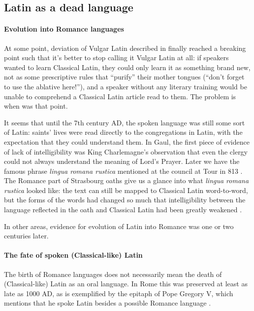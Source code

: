 \documentclass[a4paper, oneside, 12pt]{report}
\newcommand*{\citepage}[1]{p.~{#1}}
\newcommand*{\citepages}[1]{pp.~{#1}}
\newcommand{\form}[1]{\emph{#1}}
\begin{document}
\subsection{Latin as a dead language}

\paragraph*{Evolution into Romance languages}
At some point, deviation of Vulgar Latin described in  
finally reached a breaking point
such that it's better to stop calling it Vulgar Latin at all:
if speakers wanted to learn Classical Latin,
they could only learn it as something brand new,
not as some prescriptive rules that ``purify'' their mother tongues 
(``don't forget to use the ablative here!''),
and a speaker without any literary training would be unable to comprehend 
a Classical Latin article read to them.
The problem is when was that point.

It seems that until the 7th century AD, the spoken language was still some sort of Latin:
saints' lives were read directly to the congregations in Latin,
with the expectation that they could understand them.
In Gaul, the first piece of evidence of lack of intelligibility
was King Charlemagne's observation that even the clergy 
could not always understand the meaning of Lord's Prayer.
Later we have the famous phrase \form{lingua romana rustica}
mentioned at the council at Tour in 813
\citep[\citepage{114}]{herman2010vulgar}.
The Romance part of Strasbourg oaths give us a glance into what \form{lingua romana rustica} looked like:
the text can still be mapped to Classical Latin word-to-word,
but the forms of the words had changed so much
that intelligibility between the language reflected in the oath and Classical Latin
had been greatly weakened \citep[\citepages{300-301}]{clackson2011blackwell}.

In other areas, evidence for evolution of Latin into Romance was one or two centuries later.

\paragraph*{The fate of spoken (Classical-like) Latin}
The birth of Romance languages does not necessarily mean 
the death of (Classical-like) Latin as an oral language.
In Rome this was preserved at least as late as 1000 AD,
as is exemplified by the epitaph of Pope Gregory V,
which mentions that he spoke Latin besides a possible Romance language 
\citep[\citepage{268}]{clackson2011blackwell}.
\end{document}
